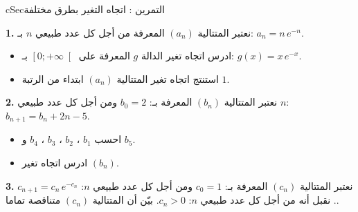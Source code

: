 \documentclass[12pt,a4paper]{article}
\newenvironment{BOX}[2]{\begin{otherlanguage}{english}\begin{arbox}{#1}{#2}}{\end{arbox}\end{otherlanguage}}
\newcounter{exo}
\newenvironment{tamrin}[1]{\stepcounter{exo}\begin{BOX}{cSec}{التمرين \theexo: #1}}{\end{BOX}}
\newenvironment{sq}{\begin{itemize}[leftmargin=2.4em,itemsep=3pt]}{\end{itemize}}
\newcommand{\qa}{\item[(أ)]}\newcommand{\qb}{\item[(ب)]}\newcommand{\qc}{\item[(جـ)]}\newcommand{\qd}{\item[(د)]}\newcommand{\qe}{\item[(هـ)]}
\newcommand{\QQ}[1]{\par\smallskip\textbf{#1.} }
\begin{document}
\begin{tamrin}{اتجاه التغير بطرق مختلفة}
\QQ{1} نعتبر المتتالية $(a_n)$ المعرفة من أجل كل عدد طبيعي $n$ بـ: $a_n=n\,e^{-n}$.
\begin{sq}
\qa ادرس اتجاه تغير الدالة $g$ المعرفة على $\left[0;+\infty\right[$ بـ: $g(x)=x\,e^{-x}$.
\qb استنتج اتجاه تغير المتتالية $(a_n)$ ابتداء من الرتبة $1$.
\end{sq}
\QQ{2} نعتبر المتتالية $(b_n)$ المعرفة بـ: $b_0=2$ ومن أجل كل عدد طبيعي $n$: $b_{n+1}=b_n+2n-5$.
\begin{sq}
\qa احسب $b_1$ ، $b_2$ ، $b_3$ ، $b_4$ و $b_5$.
\qb ادرس اتجاه تغير $(b_n)$.
\end{sq}
\QQ{3} نعتبر المتتالية $(c_n)$ المعرفة بـ: $c_0=1$ ومن أجل كل عدد طبيعي $n$: $c_{n+1}=c_n\,e^{-c_n}$.
نقبل أنه من أجل كل عدد طبيعي $n$: $c_n>0$. بيّن أن المتتالية $(c_n)$ متناقصة تماما.
\end{tamrin}
\end{document}
